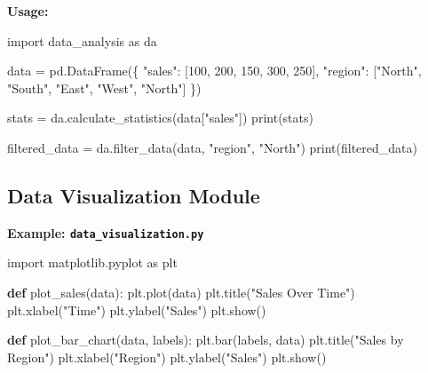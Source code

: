 \documentclass[
  letterpaper,
  DIV=11,
  numbers=noendperiod]{scrreprt}
\newenvironment{Shaded}{\begin{snugshade}}{\end{snugshade}}
\newcommand{\BuiltInTok}[1]{\textcolor[rgb]{0.00,0.23,0.31}{#1}}
\newcommand{\DecValTok}[1]{\textcolor[rgb]{0.68,0.00,0.00}{#1}}
\newcommand{\ImportTok}[1]{\textcolor[rgb]{0.00,0.46,0.62}{#1}}
\newcommand{\KeywordTok}[1]{\textcolor[rgb]{0.00,0.23,0.31}{\textbf{#1}}}
\newcommand{\NormalTok}[1]{\textcolor[rgb]{0.00,0.23,0.31}{#1}}
\newcommand{\OperatorTok}[1]{\textcolor[rgb]{0.37,0.37,0.37}{#1}}
\newcommand{\StringTok}[1]{\textcolor[rgb]{0.13,0.47,0.30}{#1}}
\begin{document}
\textbf{Usage:}

\begin{Shaded}
\begin{Highlighting}[]
\ImportTok{import}\NormalTok{ data\_analysis }\ImportTok{as}\NormalTok{ da}

\NormalTok{data }\OperatorTok{=}\NormalTok{ pd.DataFrame(\{}
    \StringTok{"sales"}\NormalTok{: [}\DecValTok{100}\NormalTok{, }\DecValTok{200}\NormalTok{, }\DecValTok{150}\NormalTok{, }\DecValTok{300}\NormalTok{, }\DecValTok{250}\NormalTok{],}
    \StringTok{"region"}\NormalTok{: [}\StringTok{"North"}\NormalTok{, }\StringTok{"South"}\NormalTok{, }\StringTok{"East"}\NormalTok{, }\StringTok{"West"}\NormalTok{, }\StringTok{"North"}\NormalTok{]}
\NormalTok{\})}

\NormalTok{stats }\OperatorTok{=}\NormalTok{ da.calculate\_statistics(data[}\StringTok{"sales"}\NormalTok{])}
\BuiltInTok{print}\NormalTok{(stats)}

\NormalTok{filtered\_data }\OperatorTok{=}\NormalTok{ da.filter\_data(data, }\StringTok{"region"}\NormalTok{, }\StringTok{"North"}\NormalTok{)}
\BuiltInTok{print}\NormalTok{(filtered\_data)}
\end{Highlighting}
\end{Shaded}

\subsection{Data Visualization Module}\label{data-visualization-module}

\textbf{Example: \texttt{data\_visualization.py}}

\begin{Shaded}
\begin{Highlighting}[]
\ImportTok{import}\NormalTok{ matplotlib.pyplot }\ImportTok{as}\NormalTok{ plt}

\KeywordTok{def}\NormalTok{ plot\_sales(data):}
\NormalTok{    plt.plot(data)}
\NormalTok{    plt.title(}\StringTok{"Sales Over Time"}\NormalTok{)}
\NormalTok{    plt.xlabel(}\StringTok{"Time"}\NormalTok{)}
\NormalTok{    plt.ylabel(}\StringTok{"Sales"}\NormalTok{)}
\NormalTok{    plt.show()}

\KeywordTok{def}\NormalTok{ plot\_bar\_chart(data, labels):}
\NormalTok{    plt.bar(labels, data)}
\NormalTok{    plt.title(}\StringTok{"Sales by Region"}\NormalTok{)}
\NormalTok{    plt.xlabel(}\StringTok{"Region"}\NormalTok{)}
\NormalTok{    plt.ylabel(}\StringTok{"Sales"}\NormalTok{)}
\NormalTok{    plt.show()}
\end{Highlighting}
\end{Shaded}
\end{document}
